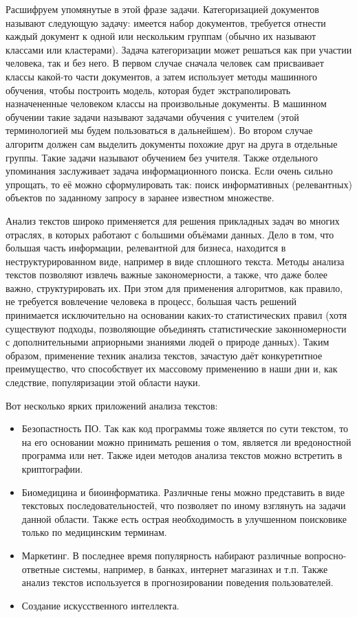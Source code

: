 \documentclass[a4paper,14pt]{extarticle}
\begin{document}
Расшифруем упомянутые в этой фразе задачи. Категоризацией документов называют следующую задачу: имеется набор документов, требуется отнести каждый документ к одной или нескольким группам (обычно их называют классами или кластерами). Задача категоризации может решаться как при участии человека, так и без него. В первом случае сначала человек сам присваивает классы какой-то части документов, а затем использует методы машинного обучения, чтобы построить модель, которая будет экстраполировать назначененные человеком классы на произвольные документы. В машинном обучении такие задачи называют задачами обучения с учителем (этой терминологией мы будем пользоваться в дальнейшем). Во втором случае алгоритм должен сам выделить документы похожие друг на друга в отдельные группы. Такие задачи называют обучением без учителя. Также отдельного упоминания заслуживает задача информационного поиска. Если очень сильно упрощать, то её можно сформулировать так: поиск информативных (релевантных) объектов по заданному запросу в заранее известном множестве.

Анализ текстов широко применяется для решения прикладных задач во многих отраслях, в которых работают с большими объёмами данных. Дело в том, что большая часть информации, релевантной для бизнеса, находится в неструктурированном виде, например в виде сплошного текста. Методы анализа текстов позволяют извлечь важные закономерности, а также, что даже более важно, структурировать их. При этом для применения алгоритмов, как правило, не требуется вовлечение человека в процесс, большая часть решений принимается исключительно на основании каких-то статистических правил (хотя существуют подходы, позволяющие объединять статистические законномерности с дополнительными априорными знаниями людей о природе данных). Таким образом, применение техник анализа текстов, зачастую даёт конкуретнтное преимущество, что способствует их массовому применению в наши дни и, как следствие, популяризации этой области науки.

Вот несколько ярких приложений анализа текстов:
\begin{itemize}
\item Безопастность ПО. Так как код программы тоже является по сути текстом, то на его основании можно принимать решения о том, является ли вредоностной программа или нет. Также идеи методов анализа текстов можно встретить в криптографии.
\item Биомедицина и биоинформатика. Различные гены можно представить в виде текстовых последовательностей, что позволяет по иному взглянуть на задачи данной области. Также есть острая необходимость в улучшенном поисковике только по медицинским терминам.
\item Маркетинг. В последнее время популярность набирают различные вопросно-ответные системы, например, в банках, интернет магазинах и т.п. Также анализ текстов используется в прогнозировании поведения пользователей.
\item Создание искусственного интеллекта.
\end{itemize}
\end{document}
